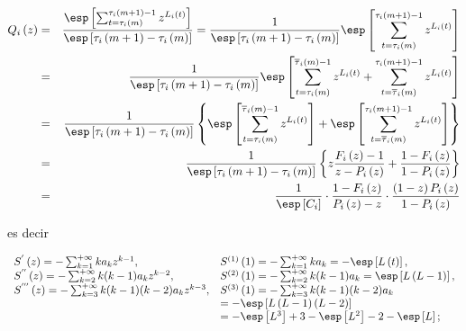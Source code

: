 \begin{eqnarray*}
Q_{i}\left(z\right)&=&\frac{\esp\left[\sum_{t=\tau_{i}\left(m\right)}^{\tau_{i}\left(m+1\right)-1}z^{L_{i}\left(t\right)}\right]}{\esp\left[\tau_{i}\left(m+1\right)-\tau_{i}\left(m\right)\right]}
=\frac{1}{\esp\left[\tau_{i}\left(m+1\right)-\tau_{i}\left(m\right)\right]}
\esp\left[\sum_{t=\tau_{i}\left(m\right)}^{\tau_{i}\left(m+1\right)-1}z^{L_{i}\left(t\right)}\right]\\
&=&\frac{1}{\esp\left[\tau_{i}\left(m+1\right)-\tau_{i}\left(m\right)\right]}
\esp\left[\sum_{t=\tau_{i}\left(m\right)}^{\overline{\tau}_{i}\left(m\right)-1}z^{L_{i}\left(t\right)}
+\sum_{t=\overline{\tau}_{i}\left(m\right)}^{\tau_{i}\left(m+1\right)-1}z^{L_{i}\left(t\right)}\right]\\
&=&\frac{1}{\esp\left[\tau_{i}\left(m+1\right)-\tau_{i}\left(m\right)\right]}\left\{
\esp\left[\sum_{t=\tau_{i}\left(m\right)}^{\overline{\tau}_{i}\left(m\right)-1}z^{L_{i}\left(t\right)}\right]
+\esp\left[\sum_{t=\overline{\tau}_{i}\left(m\right)}^{\tau_{i}\left(m+1\right)-1}z^{L_{i}\left(t\right)}\right]\right\}\\
&=&\frac{1}{\esp\left[\tau_{i}\left(m+1\right)-\tau_{i}\left(m\right)\right]}\left\{
z\frac{F_{i}\left(z\right)-1}{z-P_{i}\left(z\right)}+\frac{1-F_{i}\left(z\right)}{1-P_{i}\left(z\right)}
\right\}\\
&=&\frac{1}{\esp\left[C_{i}\right]}\cdot\frac{1-F_{i}\left(z\right)}{P_{i}\left(z\right)-z}\cdot\frac{\left(1-z\right)P_{i}\left(z\right)}{1-P_{i}\left(z\right)}
\end{eqnarray*}

es decir

\begin{eqnarray}
\begin{array}{ll}
S^{'}\left(z\right)=-\sum_{k=1}^{+\infty}ka_{k}z^{k-1},& S^{(1)}\left(1\right)=-\sum_{k=1}^{+\infty}ka_{k}=-\esp\left[L\left(t\right)\right],\\
S^{''}\left(z\right)=-\sum_{k=2}^{+\infty}k(k-1)a_{k}z^{k-2},& S^{(2)}\left(1\right)=-\sum_{k=2}^{+\infty}k(k-1)a_{k}=\esp\left[L\left(L-1\right)\right],\\
S^{'''}\left(z\right)=-\sum_{k=3}^{+\infty}k(k-1)(k-2)a_{k}z^{k-3},&
S^{(3)}\left(1\right)=-\sum_{k=3}^{+\infty}k(k-1)(k-2)a_{k}\\
&=-\esp\left[L\left(L-1\right)\left(L-2\right)\right]\\
&=-\esp\left[L^{3}\right]+3-\esp\left[L^{2}\right]-2-\esp\left[L\right];
\end{array}
\end{eqnarray}






